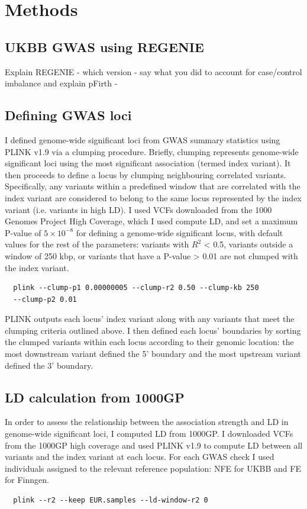 \section{Methods}
\subsection{UKBB GWAS using REGENIE}
Explain REGENIE - which version - say what you did to account for case/control imbalance and explain pFirth - 
\subsection{Defining GWAS loci}
I defined genome-wide significant loci from GWAS summary statistics using PLINK v1.9 via a clumping procedure. Briefly, clumping represents genome-wide significant loci using the most significant association (termed index variant). It then proceeds to define a locus by clumping neighbouring correlated variants. Specifically, any variants within a predefined window that are correlated with the index variant are considered to belong to the same locus represented by the index variant (i.e. variants in high LD). I used VCFs downloaded from the 1000 Genomes Project High Coverage, which I used compute LD, and set a maximum P-value of $5\times10^{-8}$ for defining a genome-wide significant locus, with default values for the rest of the parameters: variants with $R^{2}$ < 0.5, variants outside a window of 250 kbp, or variants that have a P-value > 0.01 are not clumped with the index variant.
\begin{verbatim}
  plink --clump-p1 0.00000005 --clump-r2 0.50 --clump-kb 250 
  --clump-p2 0.01
\end{verbatim}

PLINK outputs each locus' index variant along with any variants that meet the clumping criteria outlined above. I then defined each locus' boundaries by sorting the clumped variants within each locus according to their genomic location: the most downstream variant defined the 5' boundary and the most upstream variant defined the 3' boundary. 

\subsection{LD calculation from 1000GP}
In order to assess the relationship between the association strength and LD in genome-wide significant loci, I computed LD from 1000GP. I downloaded VCFs from the 1000GP high coverage and used PLINK v1.9 to compute LD between all variants and the index variant at each locus. For each GWAS check I used individuals assigned to the relevant reference population: NFE for UKBB and FE for Finngen.
\begin{verbatim}
  plink --r2 --keep EUR.samples --ld-window-r2 0 
\end{verbatim}

